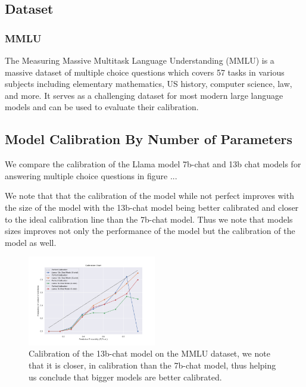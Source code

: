 \documentclass[11pt]{article}
\begin{document}
\subsection{Dataset}

\subsubsection{MMLU}
The Measuring Massive Multitask Language Understanding (MMLU) 
\cite{hendrycks2021measuring} is a massive dataset of multiple choice 
questions which covers 57 tasks in various subjects including 
elementary mathematics, US history, computer science, law, and more. It 
serves as a challenging dataset for most modern large language models and can be used to evaluate their calibration.


\subsection{Model Calibration By Number of Parameters}

We compare the calibration of the Llama \cite{touvron2023llama} model 
7b-chat and 13b chat models for answering multiple choice questions in 
figure ... 

We note that that the calibration of the model while not perfect improves 
with the size of the model with the 13b-chat model being better calibrated 
and closer to the ideal calibration line than the 7b-chat model. Thus we 
note that models sizes improves not only the performance of the model but
the calibration of the model as well.

\begin{figure}
  \centering
  \includegraphics[width=0.5\textwidth]{figures/0-shot-7b-vs-13b-chat.png}
  \caption{Calibration of the 13b-chat model on the 
  MMLU dataset, we  note that it is closer, in calibration than the 7b-chat model, thus helping us conclude that bigger models are better calibrated.}
\end{figure}
\end{document}
